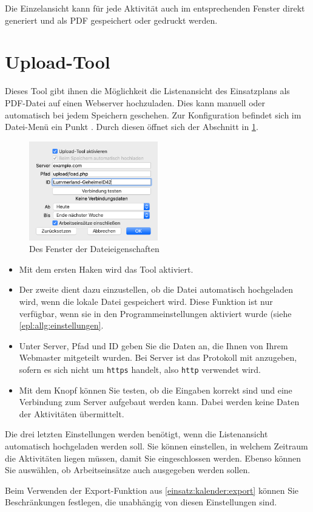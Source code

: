 Die Einzelansicht kann für jede Aktivität auch im entsprechenden Fenster direkt generiert und als PDF gespeichert oder gedruckt werden.




\section{Upload-Tool}\label{einsatz:kalender:upload}
Dieses Tool gibt ihnen die Möglichkeit die Listenansicht des Einsatzplans als PDF-Datei auf einen Webserver hochzuladen.
Dies kann manuell oder automatisch bei jedem Speichern geschehen.
Zur Konfiguration befindet sich im Datei-Menü ein Punkt .
Durch diesen öffnet sich der Abschnitt in \cref{fig:einsatz:kalender:upload}.
\begin{figure}[!h]
  \centering
	\includegraphics[width=0.5\textwidth]{img/eigenschaften_upload}
	\caption{Des Fenster der Dateieigenschaften}
	\label{fig:einsatz:kalender:upload}
\end{figure}
\begin{itemize}
  \item
  Mit dem ersten Haken wird das Tool aktiviert.
  \item
  Der zweite dient dazu einzustellen, ob die Datei automatisch hochgeladen wird, wenn die lokale Datei gespeichert wird.
  Diese Funktion ist nur verfügbar, wenn sie in den Programmeinstellungen aktiviert wurde (siehe \cref{epl:allg:einstellungen}.
  \item
  Unter Server, Pfad und ID geben Sie die Daten an, die Ihnen von Ihrem Webmaster mitgeteilt wurden.
  Bei Server ist das Protokoll mit anzugeben, sofern es sich nicht um \texttt{https} handelt, also \texttt{http} verwendet wird.
  \item
  Mit dem Knopf können Sie testen, ob die Eingaben korrekt sind und eine Verbindung zum Server aufgebaut werden kann.
  Dabei werden keine Daten der Aktivitäten übermittelt.
\end{itemize}
Die drei letzten Einstellungen werden benötigt, wenn die Listenansicht automatisch hochgeladen werden soll.
Sie können einstellen, in welchem Zeitraum die Aktivitäten liegen müssen, damit Sie eingeschlossen werden.
Ebenso können Sie auswählen, ob Arbeitseinsätze auch ausgegeben werden sollen.

\begin{hinweis}
  Beim Verwenden der Export-Funktion aus \cref{einsatz:kalender:export} können Sie Beschränkungen festlegen, die unabhängig von diesen Einstellungen sind.
\end{hinweis}

